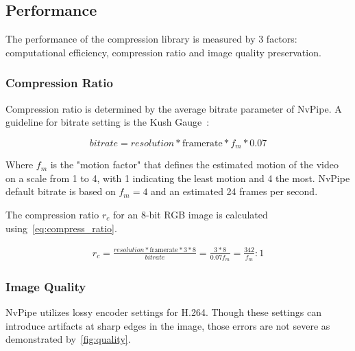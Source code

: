 \documentclass[review]{vgtc}                 %
\begin{document}

\subsection{Performance}

The performance of the compression library is measured by 3 factors: computational efficiency, compression ratio and image quality preservation.

\subsubsection{Compression Ratio}

Compression ratio is determined by the average bitrate parameter of NvPipe. A guideline for bitrate setting is the Kush Gauge~\cite{iszaidyinvestigation}:

\begin{equation}
\label{eq:bitrate}
 bitrate = resolution * \text{framerate} * f_m * 0.07 
\end{equation}

Where \(f_m\) is the "motion factor" that defines the estimated motion of the video on a scale from 1 to 4, with 1 indicating the least motion and 4 the most. NvPipe default bitrate is based on \(f_m=4\) and an estimated 24 frames per second.

The compression ratio \(r_c\) for an 8-bit RGB image is calculated using~\ref{eq:compress_ratio}.

\begin{multline}
\label{eq:compress_ratio}
 r_c = \frac{ resolution * \text{framerate} * 3 * 8}{ bitrate} = \frac{3*8}{0.07f_m} = \frac{342}{f_m} : 1
\end{multline}

\subsubsection{Image Quality}

NvPipe utilizes lossy encoder settings for H.264. Though these settings can introduce artifacts at sharp edges in the image, those errors are not severe as demonstrated by~\ref{fig:quality}.
\end{document}
